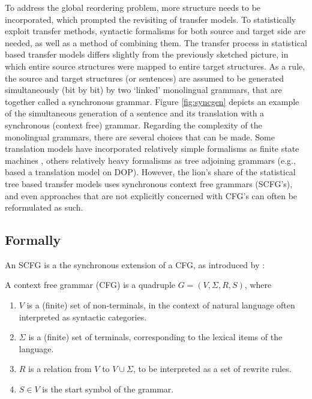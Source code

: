 To address the global reordering problem, more structure needs to be incorporated, which prompted the revisiting of transfer models. To statistically exploit transfer methods, syntactic formalisms for both source and target side are needed, as well as a method of combining them. The transfer process in statistical based transfer models differs slightly from the previously sketched picture, in which entire source structures were mapped to entire target structures. As a rule, the source and target structures (or sentences) are assumed to be generated simultaneously (bit by bit) by two `linked' monolingual grammars, that are together called a synchronous grammar.
 Figure \ref{fig:syncgen} depicts an example of the simultaneous generation of a sentence and its translation with a synchronous (context free) grammar. Regarding the complexity of the monolingual grammars, there are several choices that can be made. Some translation models have incorporated relatively simple formalisms as finite state machines \citep[e.g.,][]{alshawi2000learning}, others relatively heavy formalisms as tree adjoining grammars (e.g., \cite{poutsma2000data} based a translation model on DOP). However, the lion's share of the statistical tree based transfer models uses synchronous context free grammars (SCFG's), and even approaches that are not explicitly concerned with CFG's can often be reformulated as such.
 
\subsection{Formally}

An SCFG is a the synchronous extension of a CFG, as introduced by \cite{chomsky1956three}:

\begin{definition}
A context free grammar (CFG) is a quadruple $G = (V, \Sigma, R, S)$, where\begin{enumerate}
\item $V$ is a (finite) set of non-terminals, in the context of natural language often interpreted as syntactic categories.
\item $\Sigma$ is a (finite) set of terminals, corresponding to the lexical items of the language.
\item $R$ is a relation from $V$ to $V\cup\Sigma$, to be interpreted as a set of rewrite rules.
\item $S\in V$ is the start symbol of the grammar.
\end{enumerate}
\end{definition}

